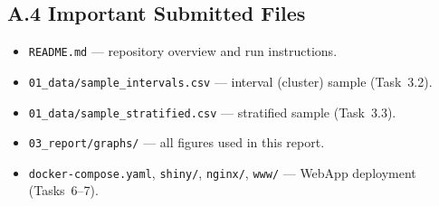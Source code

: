 \documentclass[10pt,a4paper]{article}
\begin{document}
\subsection*{A.4 Important Submitted Files}

\begin{itemize}
    \item \texttt{README.md} --- repository overview and run instructions.
    \item \texttt{01\_data/sample\_intervals.csv} --- interval (cluster) sample (Task~3.2).
    \item \texttt{01\_data/sample\_stratified.csv} --- stratified sample (Task~3.3).
    \item \texttt{03\_report/graphs/} --- all figures used in this report.
    \item \texttt{docker-compose.yaml}, \texttt{shiny/}, \texttt{nginx/},
          \texttt{www/} --- WebApp deployment (Tasks~6--7).
\end{itemize}
\end{document}
